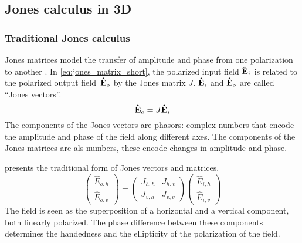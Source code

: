 \subsection{Jones calculus in 3D}

\subsubsection{Traditional Jones calculus}
Jones matrices model the transfer of amplitude and phase from one polarization to another \cite{hecht2002optics}.
In \cref{eq:jones_matrix_short}, the polarized input field $\mathbf{\hat{E}}_i$ is related to the polarized output field~$\mathbf{\hat{E}}_o$ by the Jones matrix $J$.
$\mathbf{\hat{E}}_i$ and $\mathbf{\hat{E}}_o$ are called ``Jones vectors''.
\begin{equation}
    \mathbf{\hat{E}}_o = J \mathbf{\hat{E}}_i
    \label{eq:jones_matrix_short}
\end{equation}
The components of the Jones vectors are phasors: complex numbers that encode the amplitude and phase of the field along different axes.
The components of the Jones matrices are als numbers, these encode changes in amplitude and phase.

 presents the traditional form of Jones vectors and matrices.
\begin{equation}
    \begin{pmatrix}
        \hat{E}_{o, h}\\
        \hat{E}_{o, v}
    \end{pmatrix}
    =
    \begin{pmatrix}
        J_{h, h}   &   J_{h, v} \\
        J_{v, h}   &   J_{v, v}
    \end{pmatrix}
    \begin{pmatrix}
        \hat{E}_{i, h}\\
        \hat{E}_{i, v}
    \end{pmatrix}
    \label{eq:jones_matrix_2d}
\end{equation}
The field is seen as the superposition of a horizontal and a vertical component, both linearly polarized.
The phase difference between these components determines the handedness and the ellipticity of the polarization of the field.

